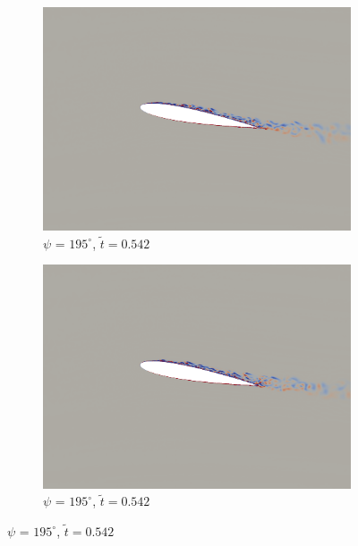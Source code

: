 \begin{figure}[H]
	\centering
	
	\begin{subfigure}[b]{0.4\textwidth}
		\centering
		\includegraphics[width=1\textwidth]{figures/mu_1pt5/vorticity/baseline/phase_195.png}
		\caption{ $\psi$ = $195^\circ$, $\tilde{t}=0.542$}
		\label{fig:mu_1pt5_baseline_psi195}
	\end{subfigure}
	\begin{subfigure}[b]{0.4\textwidth}
		\centering
		\includegraphics[width=1\textwidth]{figures/mu_1pt5/vorticity/AC/phase_195.png}
		\caption{ $\psi$ = $195^\circ$, $\tilde{t}=0.542$}
		\label{fig:mu_1pt5_AC_psi195}
	\end{subfigure}
	

\end{figure}
